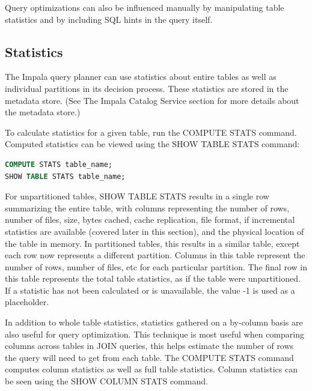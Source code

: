 \documentclass[onecolumn, draftclsnofoot,10pt, compsoc]{IEEEtran}
\begin{document}
Query optimizations can also be influenced manually by manipulating table statistics and by including SQL hints in the query itself.

\subsection{Statistics}
The Impala query planner can use statistics about entire tables as well as individual partitions in its decision process.
These statistics are stored in the metadata store.
(See The Impala Catalog Service section for more details about the metadata store.)  

To calculate statistics for a given table, run the COMPUTE STATS command. 
Computed statistics can be viewed using the SHOW TABLE STATS command:

    \begin{center}
    \begin{lstlisting}[language=SQL]
COMPUTE STATS table_name;
SHOW TABLE STATS table_name;
\end{lstlisting}
\end{center}

For unpartitioned tables, SHOW TABLE STATS results in a single row summarizing the entire table, with columns representing the number of rows, number of files, size, bytes cached, cache replication, file format, if incremental statistics are available (covered later in this section), and the physical location of the table in memory. 
In partitioned tables, this results in a similar table, except each row now represents a different partition. 
Columns in this table represent the number of rows, number of files, etc for each particular partition. 
The final row in this table represents the total table statistics, as if the table were unpartitioned. 
If a statistic has not been calculated or is unavailable, the value -1 is used as a placeholder.

In addition to whole table statistics, statistics gathered on a by-column basis are also useful for query optimization. This technique is most useful when comparing columns across tables in JOIN queries, this helps estimate the number of rows the query will need to get from each table.
The COMPUTE STATS command computes column statistics as well as full table statistics.
Column statistics can be seen using the SHOW COLUMN STATS command. 
\end{document}
